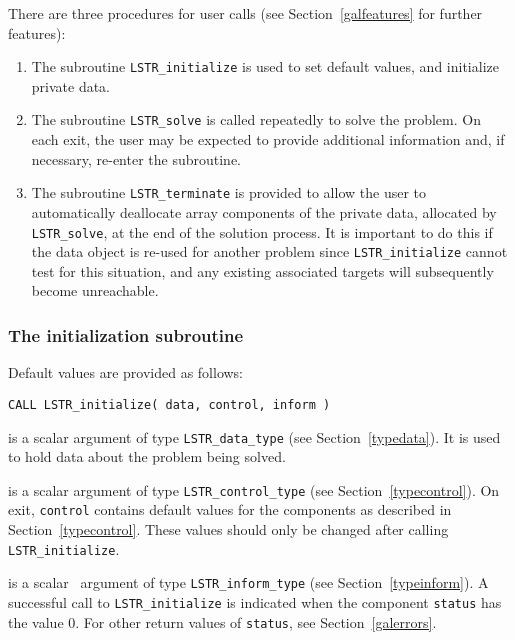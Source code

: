 \documentclass{galahad}
\newcommand{\packagename}{LS\-TR}
\begin{document}
\galarguments
There are three procedures for user calls
(see Section~\ref{galfeatures} for further features):

\begin{enumerate}
\item The subroutine
      {\tt \packagename\_initialize}
      is used to set default values, and initialize private data.
\item The subroutine
      {\tt \packagename\_solve}
      is called repeatedly to solve the problem.
      On each exit, the user may be expected to provide additional
      information and, if necessary, re-enter the subroutine.
\item The subroutine
      {\tt \packagename\_terminate}
      is provided to allow the user to automatically deallocate array
       components of the private data, allocated by
       {\tt \packagename\_solve},
       at the end of the solution process.
       It is important to do this if the data object is re-used for another
       problem since {\tt \packagename\_initialize} cannot test for this
       situation,
       and any existing associated targets will subsequently become
       unreachable.
\end{enumerate}


\subsubsection{The initialization subroutine}\label{subinit}
 Default values are provided as follows:

\hskip0.5in
{\tt CALL \packagename\_initialize( data, control, inform )}

\begin{description}

 is a scalar \intentinout argument of type
{\tt \packagename\_data\_type}
(see Section~\ref{typedata}). It is used to hold data about the problem being
solved.

 is a scalar \intentout argument of type
{\tt \packagename\_control\_type}
(see Section~\ref{typecontrol}).
On exit, {\tt control} contains default values for the components as
described in Section~\ref{typecontrol}.
These values should only be changed after calling
{\tt \packagename\_initialize}.

 is a scalar \intentout\ argument of type
{\tt \packagename\_inform\_type}
(see Section~\ref{typeinform}). A successful call to
{\tt \packagename\_initialize}
is indicated when the  component {\tt status} has the value 0.
For other return values of {\tt status}, see Section~\ref{galerrors}.

\end{description}
\end{document}
